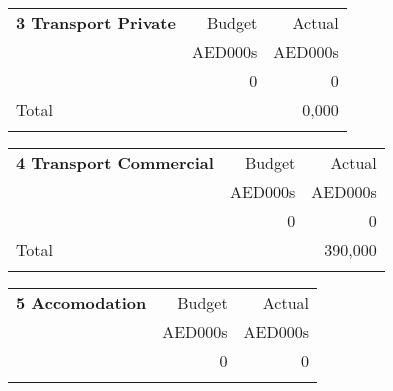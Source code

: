 \documentclass[oneside]{scrbook}
\begin{document}
\bigskip
\parindent0pt
\begin{tabularx}{\linewidth}{Xrr}
\textbf{3 Transport Private}                                                 &Budget   &Actual\\
                                                                               &AED000s &AED000s\\
 \noalign{\DotRow{}{}}    
               &0 &0\\
               
\noalign{\DotRow{}{}}                                                                                  
Total												& &0,000 \\
\noalign{\DotRow{}{}}
 \end{tabularx}    
\vspace*{1.8cm}



\bigskip
\parindent0pt
\begin{tabularx}{\linewidth}{Xrr}
\textbf{4 Transport Commercial}                                                 &Budget   &Actual\\
                                                                               &AED000s &AED000s\\
 \noalign{\DotRow{}{}}    
               &0 &0\\
               
\noalign{\DotRow{}{}}                                                                                  
Total												& &390,000 \\
\noalign{\DotRow{}{}}
 \end{tabularx}    
\vspace*{1.8cm}





\begin{tabularx}{\linewidth}{Xrr}
\textbf{5 Accomodation}                                        &Budget   &Actual\\
                                                                               &AED000s &AED000s\\
 \noalign{\DotRow{}{}}    
               &0 &0\\
\noalign{\DotRow{}{}}                                                                                  
												& & \\
 \end{tabularx}    
\vspace*{1.8cm}
\end{document}
